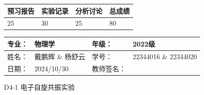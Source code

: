 \documentclass[dvipsnames, svgnames,a4paper,11pt]{article}
\begin{document}
\begin{table}
	\renewcommand\arraystretch{1.7}
	\begin{tabularx}{\textwidth}{
		|X|X|X|X
		|X|X|X|X|}
	\hline
	\multicolumn{2}{|c|}{预习报告}&\multicolumn{2}{|c|}{实验记录}&\multicolumn{2}{|c|}{分析讨论}&\multicolumn{2}{|c|}{总成绩}\\
	\hline
	\LARGE25 & & \LARGE30 & & \LARGE25 & & \LARGE80 & \\
	\hline
	\end{tabularx}
\end{table}


\begin{table}
	\renewcommand\arraystretch{1.7}
	\begin{tabularx}{\textwidth}{|X|X|X|X|}
	\hline
	专业：& 物理学 &年级：& 2022级\\
	\hline
	姓名：& 戴鹏辉 \& 杨舒云  & 学号： & 22344016 \& 22344020 \\
	\hline
	日期：& 2024/10/30 & 教师签名：& \\
	\hline
	\end{tabularx}
\end{table}

\begin{center}
	\LARGE D4-1 \quad 电子自旋共振实验
\end{center}
\end{document}
